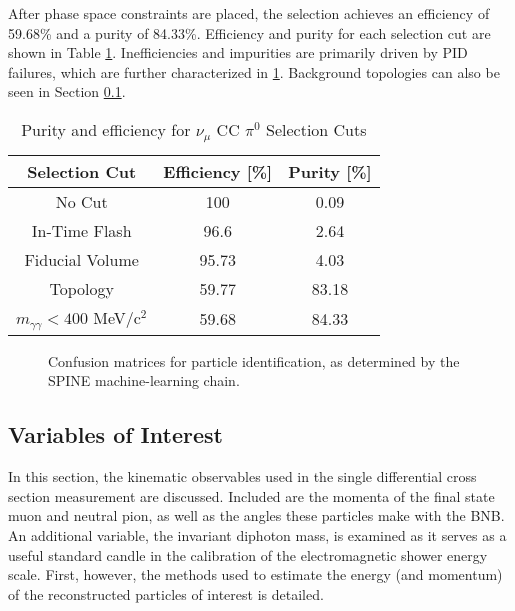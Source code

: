 \documentclass[../main.tex]{subfiles}
\begin{document}
After phase space constraints are placed, the selection achieves an efficiency of 59.68\% and a purity of 84.33\%.   Efficiency and purity for each selection cut are shown in Table \ref{Tab:pureff}.  Inefficiencies and impurities are primarily driven by PID failures, which are further characterized in \ref{fig:sel_pid_confusion}.  Background topologies can also be seen in Section \ref{subsec:vars}.

\begin{table}[ht]
    \caption{Purity and efficiency for $\nu_{\mu}$ CC $\pi^{0}$ Selection Cuts}
    \vspace{0.1cm}
    \centering
    \begin{tabular}{ c c c } 
    \hline
    Selection Cut & Efficiency [\%] & Purity [\%]  \\
    \hline
    No Cut & 100 & 0.09 \\ 
    In-Time Flash & 96.6 & 2.64 \\
    Fiducial Volume & 95.73 & 4.03 \\
    Topology & 59.77 & 83.18 \\
    $m_{\gamma \gamma} < 400$ MeV/c$^{2}$ & 59.68 & 84.33 \\
    \hline
    \end{tabular}
    \label{Tab:pureff}
\end{table}

\begin{figure}[H]
    \center
    \caption{Confusion matrices for particle identification, as determined by the SPINE machine-learning chain.}
    \label{fig:sel_pid_confusion}
\end{figure}

\subsection{Variables of Interest}
\label{subsec:vars}
In this section, the kinematic observables used in the single differential cross section measurement are discussed.  Included are the momenta of the final state muon and neutral pion, as well as the angles these particles make with the BNB.  An additional variable, the invariant diphoton mass, is examined as it serves as a useful standard candle in the calibration of the electromagnetic shower energy scale.  First, however, the methods used to estimate the energy (and momentum) of the reconstructed particles of interest is detailed.
\end{document}
